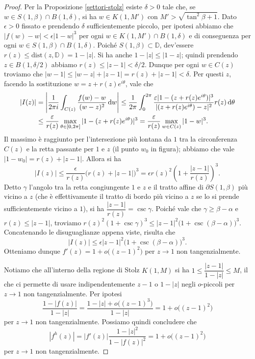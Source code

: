 \begin{proof}
  Per la Proposizione \ref{settori-stolz} esiste $\delta>0$ tale che, se $w \in S(1,\beta) \cap B(1,\delta)$, si ha $w \in K(1,M')$ con $M'>\sqrt{\tan^2\beta+1}$.
  Dato $\epsilon>0$ fissato e prendendo $\delta$ sufficientemente piccolo, per ipotesi abbiamo che $|f(w)-w|<\epsilon|1-w|^3$ per ogni $w \in K(1,M') \cap B(1,\delta)$ e di conseguenza per ogni $w \in S(1,\beta) \cap B(1,\delta)$.
  Poiché $S(1,\beta) \subset \mathbb{D}$, dev'essere $r(z) \le \text{dist}(z,\mathbb{D})=1-|z|$. Si ha anche $1-|z| \le |1-z|$; quindi prendendo $z \in B(1,\delta/2)$ abbiamo $r(z) \le |z-1|<\delta/2$. Dunque per ogni $w \in C(z)$ troviamo che $|w-1| \le |w-z|+|z-1|=r(z)+|z-1|<\delta$. Per questi $z$, facendo la sostituzione $w=z+r(z)e^{i\theta}$, vale che
  \begin{align*}
    |I(z)| & =\left|\frac{1}{2\pi i} \int_{C(z)} \frac{f(w)-w}{(w-z)^2}\mathop{}\!\mathrm{d} w\right| \le \frac{1}{2\pi} \int_0^{2\pi} \frac{\varepsilon|1-(z+r(z)e^{i\theta})|^3}{|(z+r(z)e^{i\theta})-z|^2}r(z)\mathop{}\!\mathrm{d}\theta \\
    & \le \frac{\varepsilon}{r(z)}\max_{\theta \in [0,2\pi]} |1-(z+r(z)e^{i\theta})|^3=\frac{\varepsilon}{r(z)}\max_{w \in C(z)}|1-w|^3.
  \end{align*}
  Il massimo è raggiunto per l'intersezione più lontana da $1$ tra la circonferenza $C(z)$ e la retta passante per $1$ e $z$ (il punto $w_0$ in figura); abbiamo che vale $|1-w_0|=r(z)+|z-1|$. Allora si ha
  $$|I(z)| \le \frac{\epsilon}{r(z)}\bigl(r(z)+|z-1|\bigr)^3=\epsilon r(z)^2\left(1+\frac{|z-1|}{r(z)}\right)^3.$$
  Detto $\gamma$ l'angolo tra la retta congiungente $1$ e $z$ e il tratto affine di $\partial S(1,\beta)$ più vicino a $z$ (che è effettivamente il tratto di bordo più vicino a $z$ se lo si prende sufficientemente vicino a $1$), si ha $\dfrac{|z-1|}{r(z)}=\csc\gamma$.
  Poiché vale che $\gamma \ge \beta-\alpha$ e $r(z) \le |z-1|$, troviamo $r(z)^2(1+\csc\gamma)^3 \le |z-1|^2\bigl(1+\csc(\beta-\alpha)\bigr)^3$. Concatenando le disuguaglianze appena viste, risulta che
  $$|I(z)| \le \epsilon |z-1|^2\bigl(1+\csc(\beta-\alpha)\bigr)^3.$$
  Otteniamo dunque $f'(z)=1+o\bigl((z-1)^2\bigr)$ per $z \longrightarrow 1$ non tangenzialmente.

  Notiamo che all'interno della regione di Stolz $K(1,M)$ si ha $1 \le \dfrac{|z-1|}{1-|z|} \le M$, il che ci  permette di usare indipendentemente $z-1$ o $1-|z|$ negli $o$-piccoli per $z \longrightarrow 1$ non tangenzialmente. Per ipotesi
  $$\frac{1-|f(z)|}{1-|z|}=\frac{1-|z|+o\bigl((z-1)^3\bigr)}{1-|z|}=1+o\bigl((z-1)^2\bigr)$$
  per $z \longrightarrow 1$ non tangenzialmente. Possiamo quindi concludere che
  $$|f^h(z)|=|f'(z)|\frac{1-|z|^2}{1-|f(z)|^2}=1+o\bigl((z-1)^2\bigr)$$
  per $z \longrightarrow 1$ non tangenzialmente.
\end{proof}
